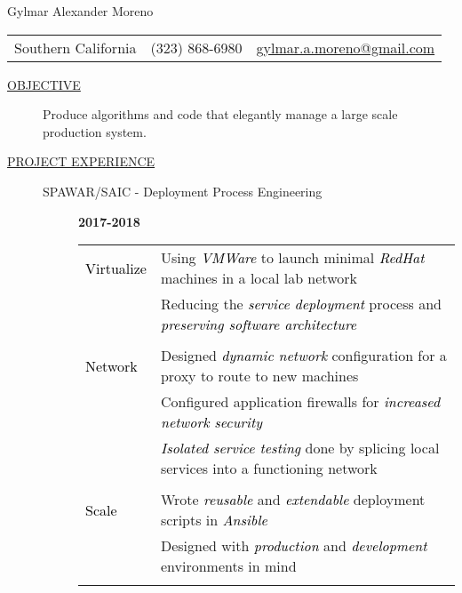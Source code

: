 \documentclass[12pt]{article}
\begin{document}
    \begin{center}
        {\LARGE Gylmar Alexander Moreno}
	\\
        \begin{tabular}{l|l|l}
            Southern California & (323) 868-6980 &
            \href{mailto:gylmar.a.moreno@gmail.com}{gylmar.a.moreno@gmail.com}
        \end{tabular}
    \end{center}

    \begin{description}
        \item[\underline{OBJECTIVE}] Produce algorithms and code that elegantly manage a large scale production system.
            \iffalse Produce algorithms and code that elegantly manage a large scale production system that\fi
        \item[\underline{PROJECT EXPERIENCE}] \hfill
            \begin{description}
                \item[SPAWAR/SAIC - Deployment Process Engineering] \hfill \textbf{2017-2018}\\
		\textcolor{gray}{
			\begin{tabular}{l|l}
					    \\[-1.0mm]
				\textcolor{black}{Virtualize} & Using \textcolor{black}{\textit{VMWare}} to launch minimal \textcolor{black}{\textit{RedHat}} machines in a local lab network\\
					   & Reducing the \textcolor{black}{\textit{service deployment}} process and \textcolor{black}{\textit{preserving software architecture}}\\
					    \\[-1.7mm]
				\textcolor{black}{Network}   & Designed \textcolor{black}{\textit{dynamic network}} configuration for a proxy to route to new machines\\
					   & Configured application firewalls for \textcolor{black}{\textit{increased network security}}\\
					   & \textcolor{black}{\textit{Isolated service testing}} done by splicing local services into a functioning network\\
					    \\[-1.7mm]
				\textcolor{black}{Scale}   & Wrote \textcolor{black}{\textit{reusable}} and \textcolor{black}{\textit{extendable}} deployment scripts in \textcolor{black}{\textit{Ansible}}\\
					   & Designed with \textcolor{black}{\textit{production}} and \textcolor{black}{\textit{development}} environments in mind\\
					    \\[-1.0mm]
		    	\end{tabular}
	    	}


\end{description}
\end{description}
\end{document}
